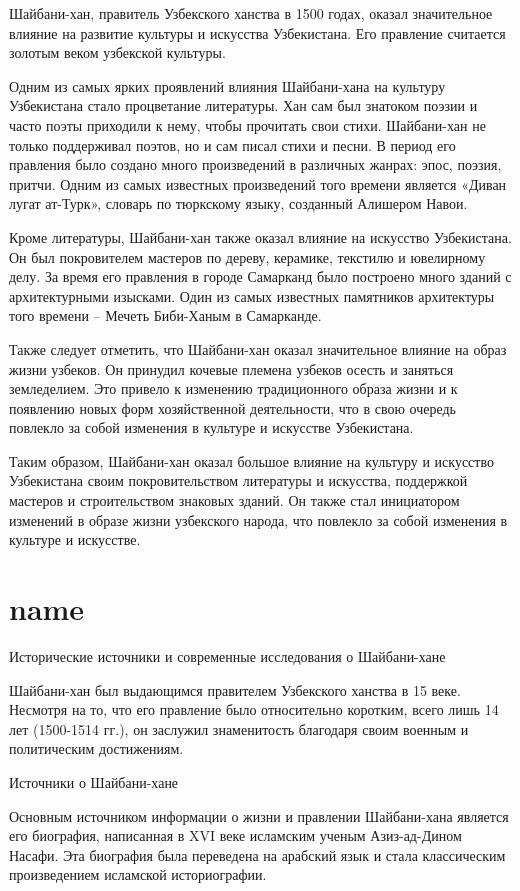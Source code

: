 \documentclass[draft]{article}
\begin{document}
Шайбани-хан, правитель Узбекского ханства в 1500 годах, оказал значительное влияние на развитие культуры и искусства Узбекистана. Его правление считается золотым веком узбекской культуры.

Одним из самых ярких проявлений влияния Шайбани-хана на культуру Узбекистана стало процветание литературы. Хан сам был знатоком поэзии и часто поэты приходили к нему, чтобы прочитать свои стихи. Шайбани-хан не только поддерживал поэтов, но и сам писал стихи и песни. В период его правления было создано много произведений в различных жанрах: эпос, поэзия, притчи. Одним из самых известных произведений того времени является «Диван лугат ат-Турк», словарь по тюркскому языку, созданный Алишером Навои.

Кроме литературы, Шайбани-хан также оказал влияние на искусство Узбекистана. Он был покровителем мастеров по дереву, керамике, текстилю и ювелирному делу. За время его правления в городе Самарканд было построено много зданий с архитектурными изысками. Один из самых известных памятников архитектуры того времени – Мечеть Биби-Ханым в Самарканде.

Также следует отметить, что Шайбани-хан оказал значительное влияние на образ жизни узбеков. Он принудил кочевые племена узбеков осесть и заняться земледелием. Это привело к изменению традиционного образа жизни и к появлению новых форм хозяйственной деятельности, что в свою очередь повлекло за собой изменения в культуре и искусстве Узбекистана.

Таким образом, Шайбани-хан оказал большое влияние на культуру и искусство Узбекистана своим покровительством литературы и искусства, поддержкой мастеров и строительством знаковых зданий. Он также стал инициатором изменений в образе жизни узбекского народа, что повлекло за собой изменения в культуре и искусстве.\newpage\section{name}
Исторические источники и современные исследования о Шайбани-хане

Шайбани-хан был выдающимся правителем Узбекского ханства в 15 веке. Несмотря на то, что его правление было относительно коротким, всего лишь 14 лет (1500-1514 гг.), он заслужил знаменитость благодаря своим военным и политическим достижениям.

Источники о Шайбани-хане

Основным источником информации о жизни и правлении Шайбани-хана является его биография, написанная в XVI веке исламским ученым Азиз-ад-Дином Насафи. Эта биография была переведена на арабский язык и стала классическим произведением исламской историографии.
\end{document}
